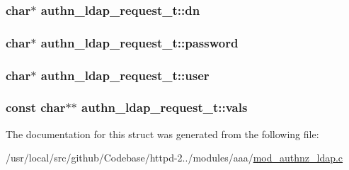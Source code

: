 \subsubsection[{\texorpdfstring{dn}{dn}}]{\setlength{\rightskip}{0pt plus 5cm}char$\ast$ authn\+\_\+ldap\+\_\+request\+\_\+t\+::dn}\hypertarget{structauthn__ldap__request__t_a4b32a7f97f77301b77ad54c9c4ab92c1}{}\label{structauthn__ldap__request__t_a4b32a7f97f77301b77ad54c9c4ab92c1}
\subsubsection[{\texorpdfstring{password}{password}}]{\setlength{\rightskip}{0pt plus 5cm}char$\ast$ authn\+\_\+ldap\+\_\+request\+\_\+t\+::password}\hypertarget{structauthn__ldap__request__t_ab2c9b31b2990c7e13cc9b648e707c7f4}{}\label{structauthn__ldap__request__t_ab2c9b31b2990c7e13cc9b648e707c7f4}
\subsubsection[{\texorpdfstring{user}{user}}]{\setlength{\rightskip}{0pt plus 5cm}char$\ast$ authn\+\_\+ldap\+\_\+request\+\_\+t\+::user}\hypertarget{structauthn__ldap__request__t_ae5d1599488d3385e3fe9ec646ae2fee1}{}\label{structauthn__ldap__request__t_ae5d1599488d3385e3fe9ec646ae2fee1}
\subsubsection[{\texorpdfstring{vals}{vals}}]{\setlength{\rightskip}{0pt plus 5cm}const char$\ast$$\ast$ authn\+\_\+ldap\+\_\+request\+\_\+t\+::vals}\hypertarget{structauthn__ldap__request__t_a51d703e0a5d34b0b31e20411c1ecf7d7}{}\label{structauthn__ldap__request__t_a51d703e0a5d34b0b31e20411c1ecf7d7}


The documentation for this struct was generated from the following file\+:\begin{DoxyCompactItemize}
\item 
/usr/local/src/github/\+Codebase/httpd-\/2../modules/aaa/\hyperlink{mod__authnz__ldap_8c}{mod\+\_\+authnz\+\_\+ldap.\+c}\end{DoxyCompactItemize}
